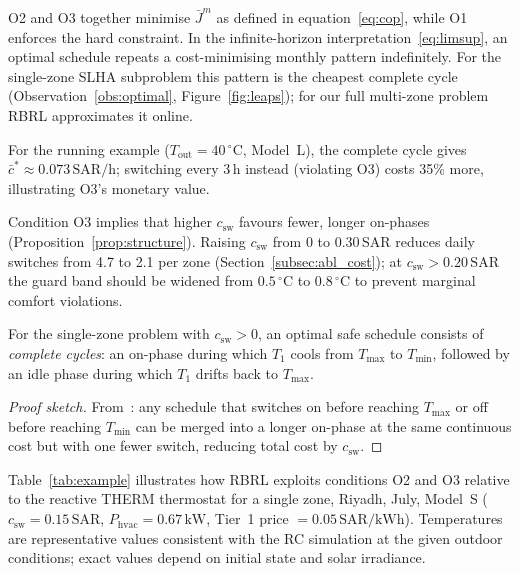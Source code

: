\documentclass[3p,number]{elsarticle}
\newcommand{\Tmin}{T_{\min}}
\newcommand{\Tmax}{T_{\max}}
\newcommand{\Tout}{T_{\mathrm{out}}}
\newcommand{\csw}{c_{\mathrm{sw}}}
\newcommand{\Phvac}{P_{\mathrm{hvac}}}
\newcommand{\Jbar}{\bar{J}}
\newcommand{\SAR}{\text{SAR}}
\newcommand{\kWh}{\text{kWh}}
\begin{document}
O2 and O3 together minimise $\Jbar^m$ as defined in equation~\eqref{eq:cop}, while O1 enforces the hard constraint.
In the infinite-horizon interpretation~\eqref{eq:limsup}, an optimal schedule repeats a cost-minimising monthly pattern indefinitely.
For the single-zone SLHA subproblem this pattern is the cheapest complete cycle (Observation~\ref{obs:optimal}, Figure~\ref{fig:leaps}); for our full multi-zone problem RBRL approximates it online.
 
For the running example ($\Tout=40\,^\circ$C, Model~L), the complete cycle gives $\bar{c}^*\approx0.073\,\text{SAR/h}$; switching every 3\,h instead (violating O3) costs 35\% more, illustrating O3's monetary value.
 
\begin{remark}
\label{rem:csw}
Condition O3 implies that higher $\csw$ favours fewer, longer on-phases
(Proposition~\ref{prop:structure}).
Raising $\csw$ from 0 to 0.30\,SAR reduces daily switches from 4.7 to
2.1 per zone (Section~\ref{subsec:abl_cost}); at $\csw>0.20\,\SAR$ the
guard band should be widened from $0.5\,^\circ$C to $0.8\,^\circ$C to
prevent marginal comfort violations.
\end{remark}
 
\begin{proposition}
\label{prop:structure}
For the single-zone problem with $\csw>0$, an optimal safe schedule
consists of \emph{complete cycles}: an on-phase during which $T_1$
cools from $\Tmax$ to $\Tmin$, followed by an idle phase during which
$T_1$ drifts back to $\Tmax$.
\end{proposition}
\begin{proof}[Proof sketch]
From~\cite[Theorem~2]{Mousa2016}: any schedule that switches on before reaching $\Tmax$ or off before reaching $\Tmin$ can be merged into a longer on-phase at the same continuous cost but with one fewer switch, reducing total cost by $\csw$.
\end{proof}
 
Table~\ref{tab:example} illustrates how RBRL exploits conditions O2 and O3 relative to the reactive THERM thermostat for a single zone, Riyadh, July, Model~S ($\csw=0.15\,\SAR$, $\Phvac=0.67\,\text{kW}$, Tier~1 price $=0.05\,\SAR/\kWh$).
Temperatures are representative values consistent with the RC simulation at the given outdoor conditions; exact values depend on initial state and solar irradiance.
 
\end{document}
